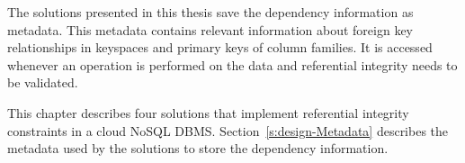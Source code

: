 The solutions presented in this thesis save the dependency information as
metadata. This metadata contains relevant  information about  foreign
key relationships in keyspaces and primary keys of column families. It is
accessed whenever an operation is performed on the data and referential
integrity needs to be validated.


This chapter describes  four  solutions  that implement referential
integrity constraints in a cloud \ac{NoSQL} \ac{DBMS}.
Section~\ref{s:design-Metadata} describes the metadata used by the solutions 
 to store the dependency information.

